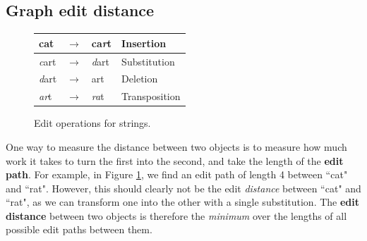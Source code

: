 \documentclass[12pt]{thesis}
\theoremstyle{plain}
\theoremstyle{definition}
\theoremstyle{remark}
\begin{document}
\subsection{Graph edit distance}

\begin{figure}
\begin{tabular}{|lcl|l|}
\hline
cat & $\rightarrow$ & ca\textit{r}t & Insertion \\ \hline
\textit{c}art & $\rightarrow$ & \textit{d}art & Substitution \\ \hline
\textit{d}art & $\rightarrow$ & art & Deletion \\ \hline
\textit{ar}t & $\rightarrow$ & \textit{ra}t & Transposition \\ \hline
\end{tabular}
\caption{Edit operations for strings.}
\vspace{-10pt}
\label{fig:string_edit_operations}
\end{figure}

One way to measure the distance between two objects is to measure how much work it takes to turn the first into the second, and take the length of the \textbf{edit path}. For example, in Figure \ref{fig:string_edit_operations}, we find an edit path of length 4 between ``cat" and ``rat". However, this should clearly not be the edit \textit{distance} between ``cat" and ``rat", as we can transform one into the other with a single substitution. The \textbf{edit distance} between two objects is therefore the \textit{minimum} over the lengths of all possible edit paths between them.
\end{document}
